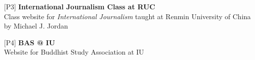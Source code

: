 \begin{cventries}
\begin{rSection}{}
{\hspace{-1.5em}[P3]\hspace{1em}}{\bodyfont\bfseries\color{darktext} {International Journalism Class at RUC \hspace{1em} \href{https://rucer.netlify.app/}{\large{\faGlobe}} \hspace{1em} \href{https://github.com/hongtaoh/guoxinban}{\Large{\faLaptop}}}}
\\\hspace{1.2em}Class website for \textit{International Journalism} taught at Renmin University of China by Michael J. Jordan \vspace{0.2em}
\end{rSection}

\begin{rSection}{}
{\vspace{-0.4em}\hspace{-1.5em}[P4]\hspace{1em}}{\bodyfont\bfseries\color{darktext} {BAS @ IU \hspace{1em} \href{https://iubsa.netlify.app/}{\large{\faGlobe}} \hspace{1em} \href{https://github.com/hongtaoh/bsa}{\Large{\faLaptop}}}}
\\\hspace{1.2em}Website for Buddhist Study Association at IU \vspace{0.2em}
\end{rSection}

\end{cventries}
